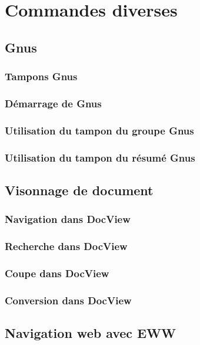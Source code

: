 \chapter{Commandes diverses}

\section{Gnus}
\subsection{Tampons Gnus}
\subsection{Démarrage de Gnus}
\subsection{Utilisation du tampon du groupe Gnus}
\subsection{Utilisation du tampon du résumé Gnus}

\section{Visonnage de document}
\subsection{Navigation dans DocView}
\subsection{Recherche dans DocView}
\subsection{Coupe dans DocView}
\subsection{Conversion dans DocView}

\section{Navigation web avec EWW}

